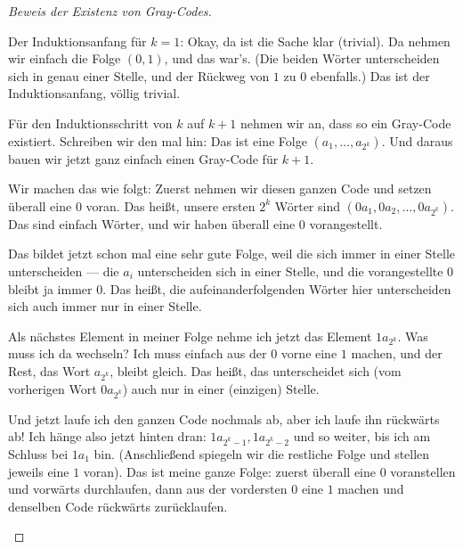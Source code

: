 \begin{proof}[Beweis der Existenz von Gray-Codes]
\begin{spoken-clean}[00:46:50 - 00:48:18]
Der Induktionsanfang für $k=1$: Okay, da ist die Sache klar (trivial). Da nehmen wir einfach die Folge $(0, 1)$, und das war's. (Die beiden Wörter unterscheiden sich in genau einer Stelle, und der Rückweg von $1$ zu $0$ ebenfalls.) Das ist der Induktionsanfang, völlig trivial.

Für den Induktionsschritt von $k$ auf $k+1$ nehmen wir an, dass so ein Gray-Code existiert. Schreiben wir den mal hin: Das ist eine Folge $(a_1, \dots, a_{2^k})$. Und daraus bauen wir jetzt ganz einfach einen Gray-Code für $k+1$. 
\end{spoken-clean}

\begin{spoken-clean}[00:48:18 - 00:49:28]
Wir machen das wie folgt: Zuerst nehmen wir diesen ganzen Code und setzen überall eine $0$ voran. Das heißt, unsere ersten $2^k$ Wörter sind $(0a_1, 0a_2, \dots, 0a_{2^k})$.  Das sind einfach Wörter, und wir haben überall eine $0$ vorangestellt.
\end{spoken-clean}

\begin{spoken-clean}[00:49:28 - 00:50:58]
Das bildet jetzt schon mal eine sehr gute Folge, weil die sich immer in einer Stelle unterscheiden --- die $a_i$ unterscheiden sich in einer Stelle, und die vorangestellte $0$ bleibt ja immer $0$. Das heißt, die aufeinanderfolgenden Wörter hier unterscheiden sich auch immer nur in einer Stelle.

Als nächstes Element in meiner Folge nehme ich jetzt das Element $1a_{2^k}$. Was muss ich da wechseln? Ich muss einfach aus der $0$ vorne eine $1$ machen, und der Rest, das Wort $a_{2^k}$, bleibt gleich. Das heißt, das unterscheidet sich (vom vorherigen Wort $0a_{2^k}$) auch nur in einer (einzigen) Stelle. 

Und jetzt laufe ich den ganzen Code nochmals ab, aber ich laufe ihn rückwärts ab! Ich hänge also jetzt hinten dran: $1a_{2^k-1}, 1a_{2^k-2}$ und so weiter, bis ich am Schluss bei $1a_1$ bin. (Anschließend spiegeln wir die restliche Folge und stellen jeweils eine $1$ voran). Das ist meine ganze Folge: zuerst überall eine $0$ voranstellen und vorwärts durchlaufen, dann aus der vordersten $0$ eine $1$ machen und denselben Code rückwärts zurücklaufen. 
\end{spoken-clean}


\end{proof}
